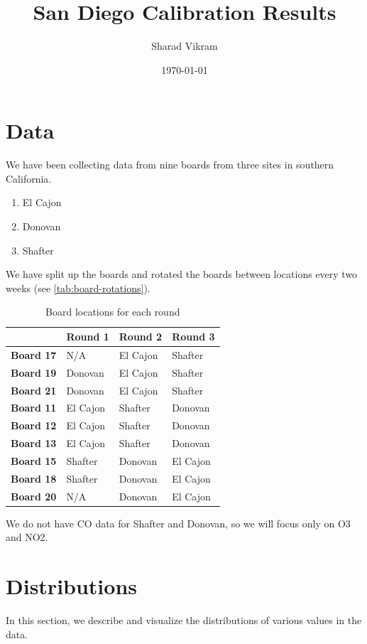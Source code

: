 \documentclass{article}
\title{San Diego Calibration Results}
\author{Sharad Vikram}
\date{\today}
\begin{document}
\maketitle

\section{Data}

We have been collecting data from nine boards
from three sites in southern California.
\begin{enumerate}
    \item El Cajon
    \item Donovan
    \item Shafter
\end{enumerate}
We have split up the boards and rotated the boards
between locations every two weeks (see \autoref{tab:board-rotations}).

\begin{table}[H]
\centering
\begin{tabular}{l|lll}
                  & \textbf{Round 1} & \textbf{Round 2} & \textbf{Round 3} \\ \hline
\textbf{Board 17} & N/A & El Cajon         & Shafter          \\
\textbf{Board 19} & Donovan          & El Cajon         & Shafter          \\
\textbf{Board 21} & Donovan          & El Cajon         & Shafter          \\ \hline
\textbf{Board 11} & El Cajon         & Shafter          & Donovan          \\
\textbf{Board 12} & El Cajon         & Shafter          & Donovan          \\
\textbf{Board 13} & El Cajon         & Shafter          & Donovan          \\ \hline
\textbf{Board 15} & Shafter          & Donovan          & El Cajon         \\
\textbf{Board 18} & Shafter          & Donovan          & El Cajon         \\
\textbf{Board 20} & N/A & Donovan          & El Cajon        
\end{tabular}
\caption{Board locations for each round}
\label{tab:board-rotations}
\end{table}

We do not have CO data for Shafter and Donovan, so we will focus only on
O3 and NO2.

\section{Distributions}
In this section, we describe
and visualize the distributions
of various values in the data.
\end{document}
